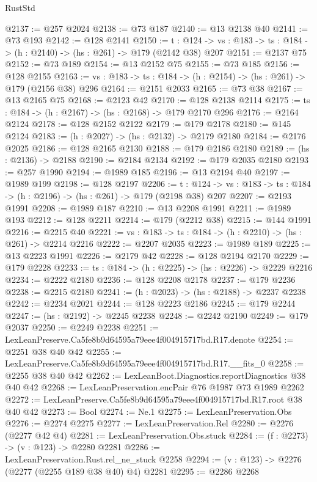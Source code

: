 \begin{lexlean}{RustStd}
\begin{coremodule}
@2137 := @257 @2024
@2138 := @73 @187
@2140 := @13 @2138 @40
@2141 := @73 @193
@2142 := @128 @2141
@2150 := {t : @124} ->
  {vs : @183} -> {ts : @184} -> (h : @2140) -> (hs : @261) -> @179 (@2142 @38) @207
@2151 := @2137 @75
@2152 := @73 @189
@2154 := @13 @2152 @75
@2155 := @73 @185
@2156 := @128 @2155
@2163 := {vs : @183} -> {ts : @184} -> (h : @2154) -> (hs : @261) -> @179 (@2156 @38) @296
@2164 := @2151 @2033
@2165 := @73 @38
@2167 := @13 @2165 @75
@2168 := @2123 @42
@2170 := @128 @2138 @2114
@2175 := {ts : @184} -> (h : @2167) -> (hs : @2168) -> @179 @2170 @296
@2176 := @2164 @2124
@2178 := @128 @2152 @2122
@2179 := @179 @2178
@2180 := @145 @2124
@2183 := (h : @2027) -> (hs : @2132) -> @2179 @2180
@2184 := @2176 @2025
@2186 := @128 @2165 @2130
@2188 := @179 @2186 @2180
@2189 := (hs : @2136) -> @2188
@2190 := @2184 @2134
@2192 := @179 @2035 @2180
@2193 := @257 @1990
@2194 := @1989 @185
@2196 := @13 @2194 @40
@2197 := @1989 @199
@2198 := @128 @2197
@2206 := {t : @124} ->
  {vs : @183} -> {ts : @184} -> (h : @2196) -> (hs : @261) -> @179 (@2198 @38) @207
@2207 := @2193 @1991
@2208 := @1989 @187
@2210 := @13 @2208 @1991
@2211 := @1989 @193
@2212 := @128 @2211
@2214 := @179 (@2212 @38)
@2215 := @144 @1991
@2216 := @2215 @40
@2221 := {vs : @183} -> {ts : @184} -> (h : @2210) -> (hs : @261) -> @2214 @2216
@2222 := @2207 @2035
@2223 := @1989 @189
@2225 := @13 @2223 @1991
@2226 := @2179 @42
@2228 := @128 @2194 @2170
@2229 := @179 @2228
@2233 := {ts : @184} -> (h : @2225) -> (hs : @2226) -> @2229 @2216
@2234 := @2222 @2180
@2236 := @128 @2208 @2178
@2237 := @179 @2236
@2238 := @2215 @2180
@2241 := (h : @2023) -> (hs : @2188) -> @2237 @2238
@2242 := @2234 @2021
@2244 := @128 @2223 @2186
@2245 := @179 @2244
@2247 := (hs : @2192) -> @2245 @2238
@2248 := @2242 @2190
@2249 := @179 @2037
@2250 := @2249 @2238
@2251 := LexLeanPreserve.Ca5fe8b9d64595a79eee4f004915717bd.R17.denote
@2254 := @2251 @38 @40 @42
@2255 := LexLeanPreserve.Ca5fe8b9d64595a79eee4f004915717bd.R17.__fits_0
@2258 := @2255 @38 @40 @42
@2262 := LexLeanBoot.Diagnostics.reportDiagnostics @38 @40 @42
@2268 := LexLeanPreservation.encPair @76 @1987 @73 @1989 @2262
@2272 := LexLeanPreserve.Ca5fe8b9d64595a79eee4f004915717bd.R17.root @38 @40 @42
@2273 := Bool
@2274 := Ne.{1}
@2275 := LexLeanPreservation.Obs
@2276 := @2274 @2275
@2277 := LexLeanPreservation.Rel
@2280 := @2276 (@2277 @42 @4)
@2281 := LexLeanPreservation.Obs.stuck
@2284 := (f : @2273) -> (v : @123) -> @2280 @2281
@2286 := LexLeanPreservation.Rust.rel_ne_stuck @2258
@2294 := (v : @123) -> @2276 (@2277 (@2255 @189 @38 @40) @4) @2281
@2295 := @2286 @2268

\end{coremodule}
\end{lexlean}
